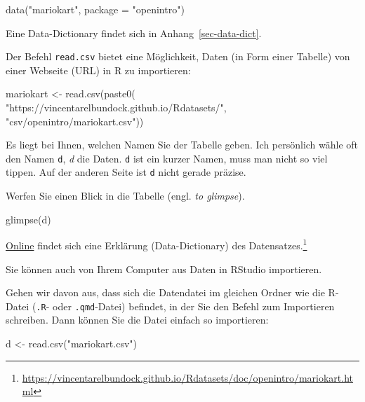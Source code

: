 \documentclass[
  letterpaper,
  oneside,
  open=any]{scrbook}
\newenvironment{Shaded}{\begin{snugshade}}{\end{snugshade}}
\newcommand{\AttributeTok}[1]{\textcolor[rgb]{0.40,0.45,0.13}{#1}}
\newcommand{\FunctionTok}[1]{\textcolor[rgb]{0.28,0.35,0.67}{#1}}
\newcommand{\NormalTok}[1]{\textcolor[rgb]{0.00,0.23,0.31}{#1}}
\newcommand{\OtherTok}[1]{\textcolor[rgb]{0.00,0.23,0.31}{#1}}
\newcommand{\StringTok}[1]{\textcolor[rgb]{0.13,0.47,0.30}{#1}}
\theoremstyle{definition}
\theoremstyle{definition}
\theoremstyle{definition}
\theoremstyle{remark}
\begin{document}
\begin{Shaded}
\begin{Highlighting}[]
\FunctionTok{data}\NormalTok{(}\StringTok{"mariokart"}\NormalTok{, }\AttributeTok{package =} \StringTok{"openintro"}\NormalTok{)}
\end{Highlighting}
\end{Shaded}

Eine Data-Dictionary findet sich in Anhang~\ref{sec-data-dict}.

Der Befehl \texttt{read.csv} bietet eine Möglichkeit, Daten (in Form
einer Tabelle) von einer Webseite (URL) in R zu importieren:

\begin{Shaded}
\begin{Highlighting}[]
\NormalTok{mariokart }\OtherTok{\textless{}{-}} \FunctionTok{read.csv}\NormalTok{(}\FunctionTok{paste0}\NormalTok{(}
  \StringTok{"https://vincentarelbundock.github.io/Rdatasets/"}\NormalTok{,}
  \StringTok{"csv/openintro/mariokart.csv"}\NormalTok{))}
\end{Highlighting}
\end{Shaded}

Es liegt bei Ihnen, welchen Namen Sie der Tabelle geben. Ich persönlich
wähle oft den Namen \texttt{d}, \emph{d} die Daten. \texttt{d} ist ein
kurzer Namen, muss man nicht so viel tippen. Auf der anderen Seite ist
\texttt{d} nicht gerade präzise.

Werfen Sie einen Blick in die Tabelle (engl. \emph{to glimpse}).

\begin{Shaded}
\begin{Highlighting}[]
\FunctionTok{glimpse}\NormalTok{(d)}
\end{Highlighting}
\end{Shaded}

\href{https://vincentarelbundock.github.io/Rdatasets/doc/openintro/mariokart.html}{Online}
findet sich eine Erklärung (Data-Dictionary) des Datensatzes.\footnote{\url{https://vincentarelbundock.github.io/Rdatasets/doc/openintro/mariokart.html}}

Sie können auch von Ihrem Computer aus Daten in RStudio importieren.

Gehen wir davon aus, dass sich die Datendatei im gleichen Ordner wie die
R-Datei (\texttt{.R}- oder \texttt{.qmd}-Datei) befindet, in der Sie den
Befehl zum Importieren schreiben. Dann können Sie die Datei einfach so
importieren:

\begin{Shaded}
\begin{Highlighting}[]
\NormalTok{d }\OtherTok{\textless{}{-}} \FunctionTok{read.csv}\NormalTok{(}\StringTok{"mariokart.csv"}\NormalTok{)}
\end{Highlighting}
\end{Shaded}
\end{document}
